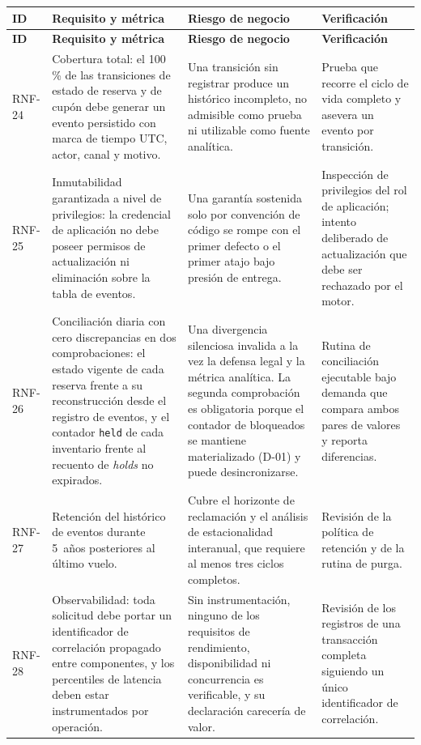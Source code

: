 \documentclass[10pt,letterpaper]{article}
\begin{document}
\begin{longtable}{@{}L{1.5cm} L{5.0cm} L{4.6cm} L{4.9cm}@{}}
\toprule \textbf{ID} & \textbf{Requisito y métrica} & \textbf{Riesgo de negocio} & \textbf{Verificación} \\ \midrule \endfirsthead
\toprule \textbf{ID} & \textbf{Requisito y métrica} & \textbf{Riesgo de negocio} & \textbf{Verificación} \\ \midrule \endhead
RNF-24 & Cobertura total: el 100\,\% de las transiciones de estado de reserva y de cupón debe generar un evento persistido con marca de tiempo UTC, actor, canal y motivo. & Una transición sin registrar produce un histórico incompleto, no admisible como prueba ni utilizable como fuente analítica. & Prueba que recorre el ciclo de vida completo y asevera un evento por transición. \\
RNF-25 & Inmutabilidad garantizada a nivel de privilegios: la credencial de aplicación no debe poseer permisos de actualización ni eliminación sobre la tabla de eventos. & Una garantía sostenida solo por convención de código se rompe con el primer defecto o el primer atajo bajo presión de entrega. & Inspección de privilegios del rol de aplicación; intento deliberado de actualización que debe ser rechazado por el motor. \\
RNF-26 & Conciliación diaria con cero discrepancias en dos comprobaciones: el estado vigente de cada reserva frente a su reconstrucción desde el registro de eventos, y el contador \texttt{held} de cada inventario frente al recuento de \emph{holds} no expirados. & Una divergencia silenciosa invalida a la vez la defensa legal y la métrica analítica. La segunda comprobación es obligatoria porque el contador de bloqueados se mantiene materializado (D-01) y puede desincronizarse. & Rutina de conciliación ejecutable bajo demanda que compara ambos pares de valores y reporta diferencias. \\
RNF-27 & Retención del histórico de eventos durante 5~años posteriores al último vuelo. & Cubre el horizonte de reclamación y el análisis de estacionalidad interanual, que requiere al menos tres ciclos completos. & Revisión de la política de retención y de la rutina de purga. \\
RNF-28 & Observabilidad: toda solicitud debe portar un identificador de correlación propagado entre componentes, y los percentiles de latencia deben estar instrumentados por operación. & Sin instrumentación, ninguno de los requisitos de rendimiento, disponibilidad ni concurrencia es verificable, y su declaración carecería de valor. & Revisión de los registros de una transacción completa siguiendo un único identificador de correlación. \\

\end{longtable}
\end{document}
